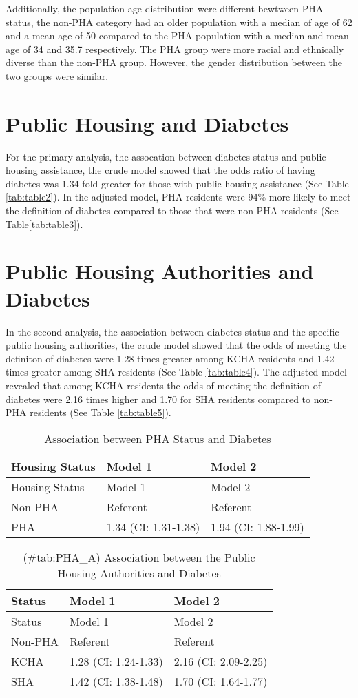 \documentclass [11pt, proquest] {uwthesis}[2015/03/03]
\begin{document}
Additionally, the population age distribution were different bewtween
PHA status, the non-PHA category had an older population with a median
of age of 62 and a mean age of 50 compared to the PHA population with a
median and mean age of 34 and 35.7 respectively. The PHA group were more
racial and ethnically diverse than the non-PHA group. However, the
gender distribution between the two groups were similar.

\section{Public Housing and Diabetes}\label{public-housing-and-diabetes}

For the primary analysis, the assocation between diabetes status and
public housing assistance, the crude model showed that the odds ratio of
having diabetes was 1.34 fold greater for those with public housing
assistance (See Table \ref{tab:table2}). In the adjusted model, PHA
residents were 94\% more likely to meet the definition of diabetes
compared to those that were non-PHA residents (See
Table\ref{tab:table3}).

\section{Public Housing Authorities and
Diabetes}\label{public-housing-authorities-and-diabetes}

In the second analysis, the association between diabetes status and the
specific public housing authorities, the crude model showed that the
odds of meeting the definiton of diabetes were 1.28 times greater among
KCHA residents and 1.42 times greater among SHA residents (See Table
\ref{tab:table4}). The adjusted model revealed that among KCHA residents
the odds of meeting the definition of diabetes were 2.16 times higher
and 1.70 for SHA residents compared to non-PHA residents (See Table
\ref{tab:table5}).
\begin{longtable}[]{@{}lll@{}}
\caption{\label{tab:PHA} Association between PHA Status and
Diabetes}\tabularnewline
\toprule
Housing Status & Model 1 & Model 2\tabularnewline
\midrule
\endfirsthead
\toprule
Housing Status & Model 1 & Model 2\tabularnewline
\midrule
\endhead
Non-PHA & Referent & Referent\tabularnewline
PHA & 1.34 (CI: 1.31-1.38) & 1.94 (CI: 1.88-1.99)\tabularnewline
\bottomrule
\end{longtable}
\begin{longtable}[]{@{}lll@{}}
\caption{(\#tab:PHA\_A) Association between the Public Housing
Authorities and Diabetes}\tabularnewline
\toprule
Status & Model 1 & Model 2\tabularnewline
\midrule
\endfirsthead
\toprule
Status & Model 1 & Model 2\tabularnewline
\midrule
\endhead
Non-PHA & Referent & Referent\tabularnewline
KCHA & 1.28 (CI: 1.24-1.33) & 2.16 (CI: 2.09-2.25)\tabularnewline
SHA & 1.42 (CI: 1.38-1.48) & 1.70 (CI: 1.64-1.77)\tabularnewline
\bottomrule
\end{longtable}
\end{document}
